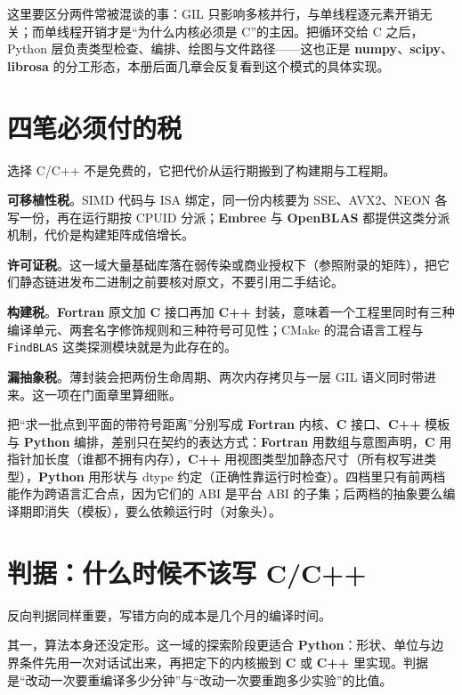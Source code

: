 \documentclass[12pt,a4paper,fontset=fandol]{ctexbook}
\newcommand{\Tp}[1]{\texttt{#1}}
\newcommand{\Lib}[1]{\textbf{#1}}
\newcommand{\Lang}[1]{\textsf{\bfseries #1}}
\newcommand{\CL}{\Lang{C}}
\newcommand{\CPP}{\Lang{C++}}
\newcommand{\FTN}{\Lang{Fortran}}
\newcommand{\PY}{\Lang{Python}}
\begin{document}
这里要区分两件常被混谈的事：GIL 只影响多核并行，与单线程逐元素开销无关；而单线程开销才是``为什么内核必须是 C''的主因。把循环交给 C 之后，Python 层负责类型检查、编排、绘图与文件路径——这也正是 \Lib{numpy}、\Lib{scipy}、\Lib{librosa} 的分工形态，本册后面几章会反复看到这个模式的具体实现。

\section{四笔必须付的税}

选择 C/C++ 不是免费的，它把代价从运行期搬到了构建期与工程期。

\textbf{可移植性税}。SIMD 代码与 ISA 绑定，同一份内核要为 SSE、AVX2、NEON 各写一份，再在运行期按 CPUID 分派；\Lib{Embree} 与 \Lib{OpenBLAS} 都提供这类分派机制，代价是构建矩阵成倍增长。

\textbf{许可证税}。这一域大量基础库落在弱传染或商业授权下（参照附录的矩阵），把它们静态链进发布二进制之前要核对原文，不要引用二手结论。

\textbf{构建税}。\FTN{} 原文加 \CL{} 接口再加 \CPP{} 封装，意味着一个工程里同时有三种编译单元、两套名字修饰规则和三种符号可见性；CMake 的混合语言工程与 \Tp{FindBLAS} 这类探测模块就是为此存在的。

\textbf{漏抽象税}。薄封装会把两份生命周期、两次内存拷贝与一层 GIL 语义同时带进来。这一项在门面章里算细账。

\begin{compare}[title={同一个内核在四种语言里的契约形态}]
把``求一批点到平面的带符号距离''分别写成 \FTN{} 内核、\CL{} 接口、\CPP{} 模板与 \PY{} 编排，差别只在契约的表达方式：\FTN{} 用数组与意图声明，\CL{} 用指针加长度（谁都不拥有内存），\CPP{} 用视图类型加静态尺寸（所有权写进类型），\PY{} 用形状与 dtype 约定（正确性靠运行时检查）。四档里只有前两档能作为跨语言汇合点，因为它们的 ABI 是平台 ABI 的子集；后两档的抽象要么编译期即消失（模板），要么依赖运行时（对象头）。
\end{compare}

\section{判据：什么时候不该写 C/C++}

反向判据同样重要，写错方向的成本是几个月的编译时间。

其一，算法本身还没定形。这一域的探索阶段更适合 \PY{}：形状、单位与边界条件先用一次对话试出来，再把定下的内核搬到 \CL{} 或 \CPP{} 里实现。判据是``改动一次要重编译多少分钟''与``改动一次要重跑多少实验''的比值。
\end{document}

